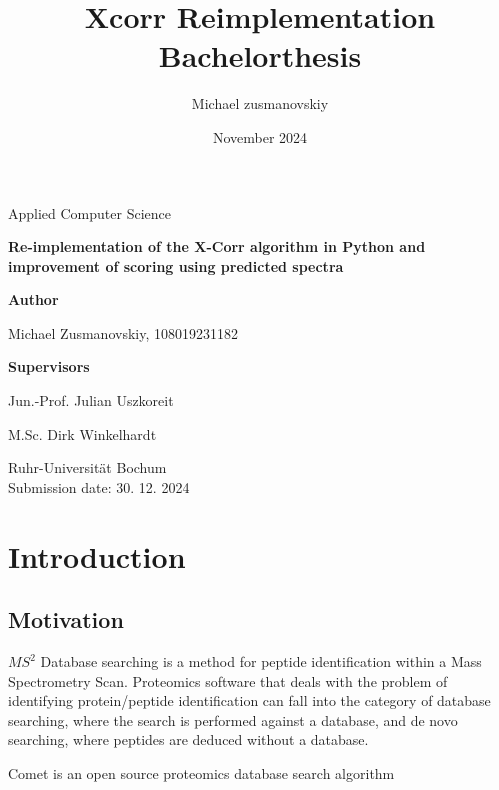 \documentclass{article}
\title{Xcorr Reimplementation Bachelorthesis}
\author{Michael zusmanovskiy}
\date{November 2024}
\begin{document}
\begin{titlepage}
    \begin{center}
        \LARGE
        Applied Computer Science

        \vspace{1.5cm}
            
        \LARGE
        \textbf{Re-implementation of the X-Corr algorithm in Python and improvement of scoring using predicted spectra}
            
        \vspace{1.5cm}

        \LARGE
        \textbf{Author}
        
        Michael Zusmanovskiy, 108019231182
        
        \vspace{1.5cm}
        
        \LARGE
        \textbf{Supervisors}
        
        Jun.-Prof. Julian Uszkoreit
        
        M.Sc. Dirk Winkelhardt
            
        \vfill
            

        \vspace{0.8cm}

        \Large
        Ruhr-Universität Bochum\\
        
        Submission date: 30. 12. 2024
            
    \end{center}
\end{titlepage}


\section{Introduction}
\subsection{Motivation}
\(MS^2\) Database searching is a method for peptide identification within a Mass Spectrometry Scan. Proteomics software
that deals with the problem of identifying protein/peptide identification can fall into the category of database searching,
where the search is performed against a database, and de novo searching, where peptides are deduced without a database.

Comet is an open source proteomics database search algorithm
\end{document}
